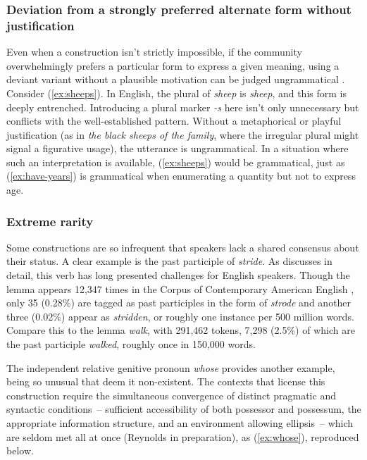 \documentclass[12pt,letterpaper]{article}
\begin{document}
\subsubsection{Deviation from a strongly preferred alternate form without justification}

Even when a construction isn't strictly impossible, if the community overwhelmingly prefers a particular form to express a given meaning, using a deviant variant without a plausible motivation can be judged ungrammatical \autocite{mayerthaler1988}. Consider (\ref{ex:sheeps}).
\label{ex:sheeps}
\z
In English, the plural of \textit{sheep} is \textit{sheep}, and this form is deeply entrenched. Introducing a plural marker \textit{-s} here isn't only unnecessary but conflicts with the well-established pattern. Without a metaphorical or playful justification (as in \textit{the black sheeps of the family}, where the irregular plural might signal a figurative usage), the utterance is ungrammatical. In a situation where such an interpretation is available, (\ref{ex:sheeps}) would be grammatical, just as (\ref{ex:have-years}) is grammatical when enumerating a quantity but not to express age.

\subsubsection{Extreme rarity}
Some constructions are so infrequent that speakers lack a shared consensus about their status. A clear example is the past participle of \textit{stride}.  As \textcite{woolf1980past} discusses in detail, this verb has long presented challenges for English speakers. Though the lemma appears 12,347 times in the Corpus of Contemporary American English \autocite{Davies2008COCA}, only 35 (0.28\%) are tagged as past participles in the form of \textit{strode} and another three (0.02\%) appear as \textit{stridden}, or roughly one instance per 500 million words. Compare this to the lemma \textit{walk}, with 291,462 tokens, 7,298 (2.5\%) of which are the past participle \textit{walked}, roughly once in 150,000 words. 

The independent relative genitive pronoun \textit{whose} provides another example, being so unusual that \textcite{hankamer1973whose} deem it non-existent. The contexts that license this construction require the simultaneous convergence of distinct pragmatic and syntactic conditions~-- sufficient accessibility of both possessor and possessum, the appropriate information structure, and an environment allowing ellipsis~-- which are seldom met all at once (Reynolds in preparation), as (\ref{ex:whose}), reproduced below.
\end{document}
